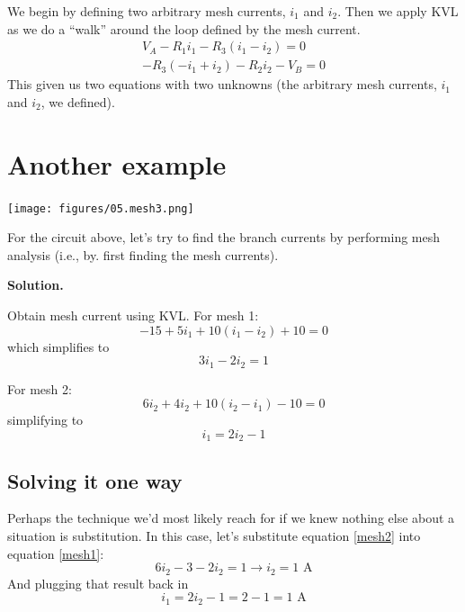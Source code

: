 \documentclass[11pt]{book}
\begin{document}
We begin by defining two arbitrary mesh currents, $i_1$ and $i_2$. Then we apply KVL as we do a ``walk'' around the loop defined by the mesh current.
\begin{eqnarray}
	V_A - R_1i_1 - R_3(i_1 - i_2) = 0 \\
	-R_3(-i_1 +i_2) - R_2i_2 - V_B = 0
\end{eqnarray}
This given us two equations with two unknowns (the arbitrary mesh currents, $i_1$ and $i_2$, we defined).

\section{Another example}
\begin{center}
	\texttt{[image: figures/05.mesh3.png]}
\end{center}

For the circuit above, let's try to find the branch currents by performing mesh analysis (i.e., by. first finding the mesh currents).

\textbf{Solution.}

Obtain mesh current using KVL. For mesh 1:
\begin{equation}
	-15 + 5 i_1 + 10(i_1 - i_2) + 10 = 0
\end{equation}
which simplifies to 
\begin{equation}
	3i_1 - 2i_2 = 1
	\label{mesh1}
\end{equation}

For  mesh 2:
\begin{equation}
	6i_2 + 4 i_2 + 10(i_2 - i_1) - 10 = 0
\end{equation}
simplifying to
\begin{equation}
	i_1 = 2i_2 - 1
	\label{mesh2}
\end{equation}

\subsection{Solving it one way}
Perhaps the technique we'd most likely reach for if we knew nothing else about a situation is substitution. In this case, let's substitute equation \ref{mesh2} into equation \ref{mesh1}:
\begin{equation}
	6i_2 - 3 - 2i_2 = 1 \rightarrow i_2 = 1 \text{ A}
\end{equation}
And plugging that result back in
\begin{equation}
	i_1 = 2i_2 -1 = 2 - 1 = 1 \text{ A}
\end{equation}
\end{document}
